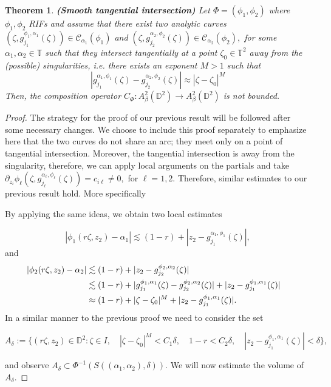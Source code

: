 \documentclass[12pt]{amsart}
\newtheorem{theorem}{Theorem}[section]
\numberwithin{equation}{section}
\begin{document}
\begin{theorem}\textbf{(Smooth tangential intersection)} Let $\Phi=(\phi_1,\phi_2)$ where $\phi_1,\phi_2$ RIFs and assume that there exist two analytic curves $(\zeta,g_{j_1}^{\phi_1,\alpha_1}(\zeta))\in\mathcal{C}_{{\alpha}_1}(\phi_1)$ and $(\zeta,g^{\alpha_2,\phi_2}_{j_2}(\zeta))\in\mathcal{C}_{\alpha_2}(\phi_2),$ for some $\alpha_1,\alpha_2\in\mathbb{T}$ such that they intersect tangentially at a point $\zeta_0\in\mathbb{T}^2$ away from the (possible) singularities, i.e. there exists an exponent $M>1$ such that 
$$|g^{\alpha_1,\phi_1}_{j_1}(\zeta)-g_{j_2}^{\alpha_2,\phi_2}(\zeta)|\approx |\zeta-\zeta_0|^M$$
Then, the composition operator $C_{\Phi}:A^2_{\beta}(\mathbb{D}^2)\to A^2_{\beta}(\mathbb{D}^2)$ is not bounded. 
\end{theorem}
\begin{proof} The strategy for the proof of our previous result will be followed after some necessary changes. We choose to include this proof separately to emphasize here that the two curves do not share an arc; they meet only on a point of tangential intersection. Moreover, the tangential intersection is away from the singularity, therefore, we can apply local arguments on the partials and take $\partial_{z_i}\phi_{\ell}(\zeta,g_{j_\ell}^{\alpha_{\ell},\phi_{\ell}}(\zeta))=c_{i\ell}\neq0,$ for $\ell=1,2.$ Therefore, similar estimates to our previous result hold. More specifically

By applying the same ideas, we obtain two local estimates

$$|\phi_1(r\zeta,z_2)-\alpha_1|\lesssim (1-r)+|z_2-g^{\alpha_1,\phi_1}_{j_1}(\zeta)|,$$
and
\begin{align}
|\phi_2(r\zeta,z_2)-\alpha_2|&\lesssim (1-r)+|z_2-g^{\phi_2,\alpha_2}_{j_2}(\zeta)| \notag&&\\
&\lesssim(1-r)+|g_{j_1}^{\phi_1,\alpha_1}(\zeta)-g_{j_2}^{\phi_2,\alpha_2}(\zeta)|+|z_2-g_{j_1}^{\phi_1,\alpha_1}(\zeta)|\notag&&\\
&\approx (1-r)+|\zeta-\zeta_0|^M+|z_2-g^{\phi_1,\alpha_1}_{j_1}(\zeta)|
.\end{align}
In a similar manner to the previous proof we need to consider the set

$$A_{\delta}:=\Bigg\{(r\zeta,z_2)\in\mathbb{D}^2:\zeta\in I,\quad|\zeta-\zeta_0|^M<C_1\delta,\quad 1-r<C_2\delta, \quad|z_2-g_{j_1}^{\phi_1,\alpha_1}(\zeta)|<\delta\Bigg\},$$

and observe $A_{\delta}\subset \Phi^{-1}(S((\alpha_1,\alpha_2),\delta)).$
We will now estimate the volume of $A_{\delta}.$


\end{proof}
\end{document}

